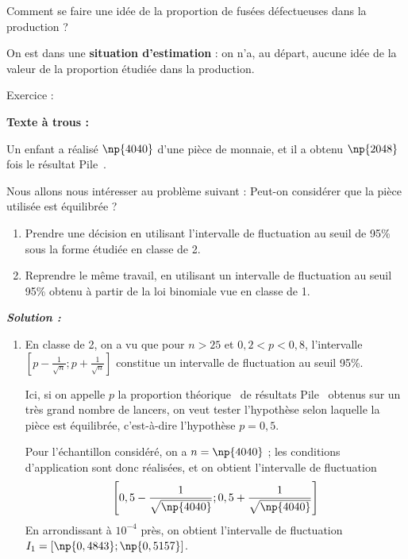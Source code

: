 \begin{spacing}{1.2}
\begin{enumerate}
Comment se faire une idée de la proportion de fusées défectueuses dans la production ?

On est dans une \textbf{situation d'estimation} : on n'a, au départ, aucune idée de la valeur de la proportion étudiée dans la production.
\end{enumerate}

\medskip

\begin{center}
\PapierMill{10cm}{10cm}
\end{center}

\begin{bclogo}[couleur = blue!30 , arrondi = 0.1 ,logo = \bclampe , barre = snake , tailleOndu = 1.5]{Exercice :}


\textbf{Texte à trous :}

Un enfant a réalisé $\np{4040}$  d'une pièce de monnaie, et il a obtenu $\np{2048}$ fois le résultat \og Pile\fg~.

Nous allons nous intéresser au problème suivant : \og Peut-on considérer que la pièce utilisée est équilibrée ?\fg~

\begin{enumerate}
\item Prendre une décision en utilisant l'intervalle de fluctuation au seuil de 95\% sous la forme étudiée en classe de 2.
\item Reprendre le même travail, en utilisant un intervalle de fluctuation au seuil 95\% obtenu à partir de la loi binomiale vue en classe de 1.
\end{enumerate}
\end{bclogo}


\newpage

\textbf{\textit{Solution :}}

\begin{enumerate}
\item En classe de 2, on a vu que pour $n>25$ et $0,2<p<0,8$, l'intervalle $\left[p-\frac{1}{\sqrt{n}};p+\frac{1}{\sqrt{n}}\right]$ constitue un intervalle de fluctuation au seuil 95\%.

Ici, si on appelle $p$ la \og proportion théorique\fg~ de résultats \og Pile\fg~ obtenus sur un très grand nombre de lancers, on veut tester l'hypothèse selon laquelle la pièce est équilibrée, c'est-à-dire l'hypothèse $p=0,5$.

Pour l'échantillon considéré, on a $n=\np{4040}$ ; les conditions d'application sont donc réalisées, et on obtient l'intervalle de fluctuation 
\[\left[0,5-\frac{1}{\sqrt{\np{4040}}};0,5+\frac{1}{\sqrt{\np{4040}}}\right]\]
En arrondissant à $10^{-4}$ près, on obtient l'intervalle de fluctuation $I_1=[\np{0,4843};\np{0,5157}]$.


\end{enumerate}
\end{spacing}
